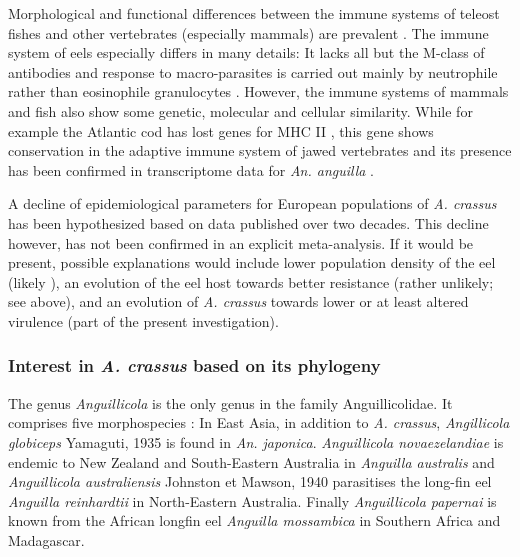 Morphological and functional differences between the immune systems of
teleost fishes and other vertebrates (especially mammals) are
prevalent \cite{press1999morphology}. The immune system of eels
especially differs in many details: It lacks all but the M-class of
antibodies and response to macro-parasites is carried out mainly by
neutrophile rather than eosinophile granulocytes
\cite{nielsen_eel_2006}. However, the immune systems of mammals and
fish also show some genetic, molecular and cellular similarity. While
for example the Atlantic cod has lost genes for MHC II
\cite{pmid21832995}, this gene shows conservation in the adaptive
immune system of jawed vertebrates \cite{pmid21078341} and its
presence has been confirmed in transcriptome data for
\textit{An. anguilla} \cite{pmid17666525}.

A decline of epidemiological parameters for European populations of
\textit{A. crassus} has been hypothesized based on data published over
two decades. This decline however, has not been confirmed in an
explicit meta-analysis. If it would be present, possible explanations
would include lower population density of the eel (likely
\cite{schabuss_dynamics_2005}), an evolution of the eel host towards
better resistance (rather unlikely; see above), and an evolution of
\textit{A. crassus} towards lower or at least altered virulence (part
of the present investigation).

\subsubsection{Interest in \textit{A. crassus} based on its
    phylogeny}
\label{phyl-int}

The genus \textit{Anguillicola} is the only genus in the family
Anguillicolidae. It comprises five morphospecies
\cite{taraschewski_revision_1988}: In East Asia, in addition to
\textit{A. crassus}, \textit{Angillicola globiceps} Yamaguti, 1935
\cite{yamaguti_globiceps} is found in \textit{An.
  japonica}. \textit{Anguillicola novaezelandiae} is endemic to New
Zealand and South-Eastern Australia in \textit{Anguilla australis} and
\textit{Anguillicola australiensis} Johnston et Mawson, 1940
\cite{johnston1940some} parasitises the long-fin eel \textit{Anguilla
  reinhardtii} in North-Eastern Australia. Finally
\textit{Anguillicola papernai} is known from the African longfin eel
\textit{Anguilla mossambica} in Southern Africa and Madagascar.


